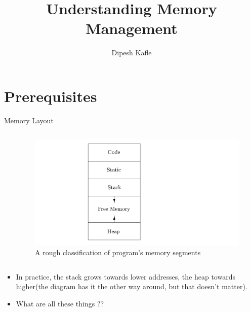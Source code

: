 \documentclass[
  10pt,
  ignorenonframetext,
]{beamer}
\title{Understanding Memory Management}
\author{Dipesh Kafle}
\date{}
\providecommand{\tightlist}{%
  \setlength{\itemsep}{0pt}\setlength{\parskip}{0pt}}
\begin{document}
\frame{\titlepage}

\hypertarget{prerequisites}{%
\section{Prerequisites}\label{prerequisites}}

\begin{frame}{Memory Layout}
\protect\hypertarget{memory-layout}{}
\begin{columns}[T]
\begin{column}{0.1\textwidth}
\end{column}

\begin{column}{0.9\textwidth}
\pause

\begin{figure}
\centering
\includegraphics[width=1\textwidth,height=\textheight]{images/memory.png}
\caption{A rough classification of program's
memory segments}
\end{figure}
\end{column}
\end{columns}

\pause

\begin{itemize}
\tightlist
\item
  In practice, the stack grows towards lower
  addresses, the heap towards higher(the diagram
  has it the other way around, but that doesn't
  matter).
\end{itemize}

\pause

\begin{itemize}
\tightlist
\item
  What are all these things ??
\end{itemize}
\end{frame}
\end{document}
